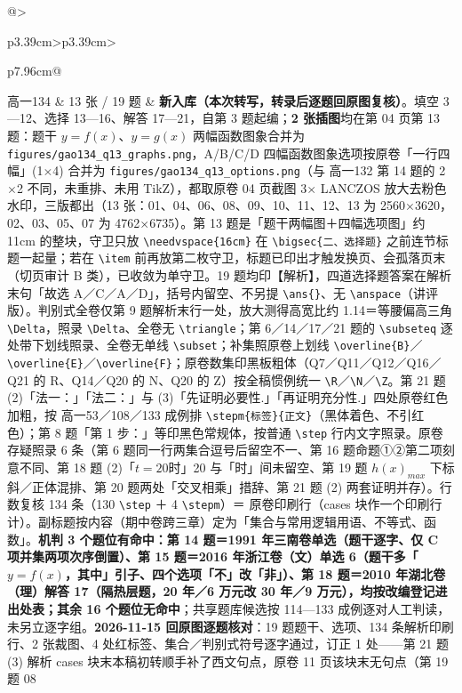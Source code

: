 \documentclass[a4paper,11pt]{article}
\begin{document}
\begin{xltabular}{\textwidth}{@{}>{\raggedright\arraybackslash}p{3.39cm}>{\centering\arraybackslash}p{3.39cm}>{\raggedright\arraybackslash}p{7.96cm}@{}}
高一134 & 13 张 / 19 题 & \textbf{新入库（本次转写，转录后逐题回原图复核）}。填空 3---12、选择 13---16、解答 17---21，自第 3 题起编；\textbf{2 张插图}均在第 04 页第 13 题：题干 \(y=f(x)\)、\(y=g(x)\) 两幅函数图象合并为 \texttt{figures/\allowbreak{}gao134\_q13\_graphs.png}，A/B/C/D 四幅函数图象选项按原卷「一行四幅」(1$\times$4) 合并为 \texttt{figures/\allowbreak{}gao134\_q13\_options.png}（与 高一132 第 14 题的 2$\times$2 不同，未重排、未用 TikZ），都取原卷 04 页截图 3$\times$ LANCZOS 放大去粉色水印，三版都出（13 张：01、04、06、08、09、10、11、12、13 为 2560$\times$3620，02、03、05、07 为 4762$\times$6735）。第 13 题是「题干两幅图＋四幅选项图」约 11cm 的整块，守卫只放 \texttt{\textbackslash{}needvspace\{16cm\}} 在 \texttt{\textbackslash{}bigsec\{二、选择题\}} 之前连节标题一起量；若在 \texttt{\textbackslash{}item} 前再放第二枚守卫，标题已印出才触发换页、会孤落页末（切页审计 B 类），已收敛为单守卫。19 题均印【解析】，四道选择题答案在解析末句「故选 A／C／A／D」，括号内留空、不另提 \texttt{\textbackslash{}ans\{\}}、无 \texttt{\textbackslash{}anspace}（讲评版）。判别式全卷仅第 9 题解析末行一处，放大测得高宽比约 1.14＝等腰偏高三角 \texttt{\textbackslash{}Delta}，照录 \texttt{\textbackslash{}Delta}、全卷无 \texttt{\textbackslash{}triangle}；第 6／14／17／21 题的 \texttt{\textbackslash{}subseteq} 逐处带下划线照录、全卷无单线 \texttt{\textbackslash{}subset}；补集照原卷上划线 \texttt{\textbackslash{}overline\{B\}}／\texttt{\textbackslash{}overline\{E\}}／\texttt{\textbackslash{}overline\{F\}}；原卷数集印黑板粗体（Q7／Q11／Q12／Q16／Q21 的 R、Q14／Q20 的 N、Q20 的 Z）按全稿惯例统一 \texttt{\textbackslash{}R}／\texttt{\textbackslash{}N}／\texttt{\textbackslash{}Z}。第 21 题 (2)「法一：」「法二：」与 (3)「先证明必要性.」「再证明充分性.」四处原卷红色加粗，按 高一53／108／133 成例排 \texttt{\textbackslash{}stepm\{标签\}\{正文\}}（黑体着色、不引红色）；第 8 题「第 1 步：」等印黑色常规体，按普通 \texttt{\textbackslash{}step} 行内文字照录。原卷存疑照录 6 条（第 6 题同一行两集合逗号后留空不一、第 16 题命题①②第二项刻意不同、第 18 题 (2)「\(t=\allowbreak 20\)时」20 与「时」间未留空、第 19 题 \(h(x)_{max}\) 下标斜／正体混排、第 20 题两处「交叉相乘」措辞、第 21 题 (2) 两套证明并存）。行数复核 134 条（130 \texttt{\textbackslash{}step} ＋ 4 \texttt{\textbackslash{}stepm}）＝ 原卷印刷行（cases 块作一个印刷行计）。副标题按内容（期中卷跨三章）定为「集合与常用逻辑用语、不等式、函数」。\textbf{机判 3 个题位有命中：第 14 题＝1991 年三南卷单选（题干逐字、仅 C 项并集两项次序倒置）、第 15 题＝2016 年浙江卷（文）单选 6（题干多「\(y=f(x)\)，其中」引子、四个选项「不」改「非」）、第 18 题＝2010 年湖北卷（理）解答 17（隔热层题，20 年／6 万元改 30 年／9 万元），均按改编登记进出处表；其余 16 个题位无命中}；共享题库候选按 114---133 成例逐对人工判读，未另立逐字组。\textbf{2026-11-15 回原图逐题核对}：19 题题干、选项、134 条解析印刷行、2 张裁图、4 处红标签、集合／判别式符号逐字通过，订正 1 处------第 21 题 (3) 解析 cases 块末本稿初转顺手补了西文句点，原卷 11 页该块末无句点（第 19 题 08 
\end{xltabular}
\end{document}
